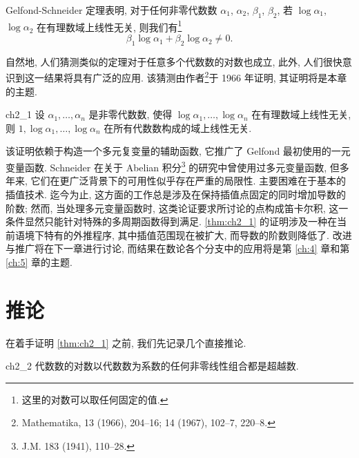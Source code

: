 Gelfond-Schneider 定理表明, 对于任何非零代数数 $\alpha_1$, $\alpha_2$, $\beta_1$, $\beta_2$, 若 $\log \alpha_1$, $\log \alpha_2$ 在有理数域上线性无关, 则我们有\footnote{这里的对数可以取任何固定的值.}
\[
\beta_1 \log \alpha_1 + \beta_2 \log \alpha_2 \neq 0.
\]

自然地, 人们猜测类似的定理对于任意多个代数数的对数也成立, 此外, 人们很快意识到这一结果将具有广泛的应用. 该猜测由作者\footnote{Mathematika, 13 (1966), 204--16; 14 (1967), 102--7, 220--8.}于 1966 年证明, 其证明将是本章的主题.

\begin{mythm}{}{ch2_1}
设 $\alpha_1, \dots, \alpha_n$ 是非零代数数, 使得 $\log \alpha_1, \dots, \log \alpha_n$ 在有理数域上线性无关, 则 $1, \log \alpha_1, \dots, \log \alpha_n$ 在所有代数数构成的域上线性无关.
\end{mythm}

该证明依赖于构造一个多元复变量的辅助函数, 它推广了 Gelfond 最初使用的一元变量函数. Schneider 在关于 Abelian 积分\footnote{J.M. 183 (1941), 110--28.} 的研究中曾使用过多元变量函数, 但多年来, 它们在更广泛背景下的可用性似乎存在严重的局限性. 主要困难在于基本的插值技术. 迄今为止, 这方面的工作总是涉及在保持插值点固定的同时增加导数的阶数; 然而, 当处理多元变量函数时, 这类论证要求所讨论的点构成笛卡尔积, 这一条件显然只能针对特殊的多周期函数得到满足. \autoref{thm:ch2_1} 的证明涉及一种在当前语境下特有的外推程序, 其中插值范围现在被扩大, 而导数的阶数则降低了. 改进与推广将在下一章进行讨论, 而结果在数论各个分支中的应用将是第 \ref{ch:4} 章和第 \ref{ch:5} 章的主题.

\section{推论}

在着手证明 \autoref{thm:ch2_1} 之前, 我们先记录几个直接推论.

\begin{mythm}{}{ch2_2}
代数数的对数以代数数为系数的任何非零线性组合都是超越数.
\end{mythm}

